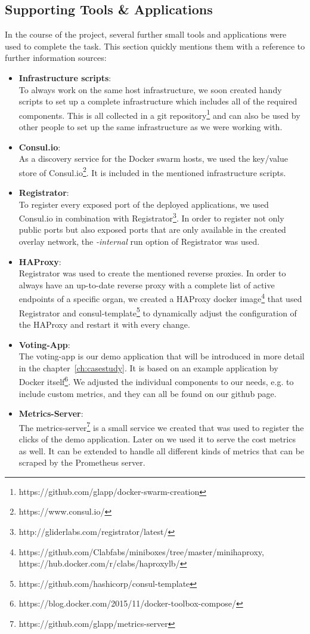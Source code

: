 \documentclass{seal_thesis}
\begin{document}
\subsection{Supporting Tools \& Applications}\label{sec:supportingTools}
In the course of the project, several further small tools and applications were used to complete the task. This section quickly mentions them with a reference to further information sources:
\begin{itemize}
	\item \textbf{Infrastructure scripts}: \\
	To always work on the same host infrastructure, we soon created handy scripts to set up a complete infrastructure which includes all of the required components.
	This is all collected in a git repository\footnote{https://github.com/glapp/docker-swarm-creation} and can also be used by other people to set up the same infrastructure as we were working with.
	\item \textbf{Consul.io}: \\
	As a discovery service for the Docker swarm hosts, we used the key/value store of Consul.io\footnote{https://www.consul.io/}.
	It is included in the mentioned infrastructure scripts.
	\item \textbf{Registrator}: \\
	To register every exposed port of the deployed applications, we used Consul.io in combination with Registrator\footnote{http://gliderlabs.com/registrator/latest/}.
	In order to register not only public ports but also exposed ports that are only available in the created overlay network, the \textit{-internal} run option of Registrator was used.
	\item \textbf{HAProxy}: \\
	Registrator was used to create the mentioned reverse proxies.
	In order to always have an up-to-date reverse proxy with a complete list of active endpoints of a specific organ, we created a HAProxy docker image\footnote{https://github.com/Clabfabs/miniboxes/tree/master/minihaproxy, https://hub.docker.com/r/clabs/haproxylb/} that used Registrator and consul-template\footnote{https://github.com/hashicorp/consul-template} to dynamically adjust the configuration of the HAProxy and restart it with every change.
	\item \textbf{Voting-App}: \\
	The voting-app is our demo application that will be introduced in more detail in the chapter~\ref{ch:casestudy}.
	It is based on an example application by Docker itself\footnote{https://blog.docker.com/2015/11/docker-toolbox-compose/}.
	We adjusted the individual components to our needs, e.g. to include custom metrics, and they can all be found on our github page.
	\item \textbf{Metrics-Server}: \\
	The metrics-server\footnote{https://github.com/glapp/metrics-server} is a small service we created that was used to register the clicks of the demo application.
	Later on we used it to serve the cost metrics as well.
	It can be extended to handle all different kinds of metrics that can be scraped by the Prometheus server.
\end{itemize}
\end{document}
